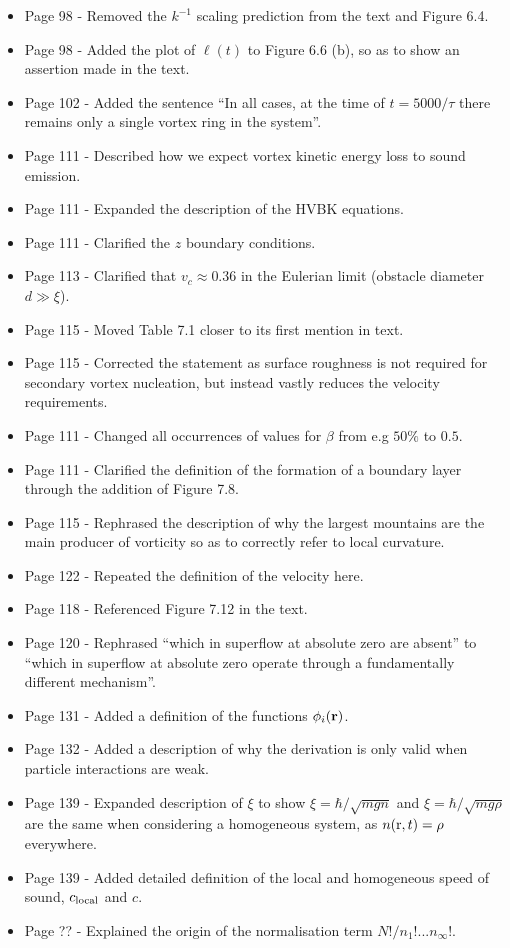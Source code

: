 \documentclass{article}
\begin{document}
\begin{itemize}
\item Page 98 - Removed the $k^{-1}$ scaling prediction from the text and Figure 6.4.
\item Page 98 - Added the plot of $\ell(t)$ to Figure 6.6 (b), so as to show an assertion made in the text.
\item Page 102 - Added the sentence ``In all cases, at the time of $t=5000/\tau$ there remains only a single vortex ring in the system''.
\item Page 111 - Described how we expect vortex kinetic energy loss to sound emission.
\item Page 111 - Expanded the description of the HVBK equations.
\item Page 111 - Clarified the $z$ boundary conditions.
\item Page 113 - Clarified that $v_c \approx 0.36$ in the Eulerian limit (obstacle diameter $d \gg \xi$).
\item Page 115 - Moved Table 7.1 closer to its first mention in text.
\item Page 115 - Corrected the statement as surface roughness is not required for secondary vortex nucleation, but instead vastly reduces the velocity requirements.
\item Page 111 - Changed all occurrences of values for $\beta$ from e.g $50\%$ to $0.5$.
\item Page 111 - Clarified the definition of the formation of a boundary layer through the addition of Figure 7.8.
\item Page 115 - Rephrased the description of why the largest mountains are the main producer of vorticity so as to correctly refer to local curvature.
\item Page 122 - Repeated the definition of the velocity here.
\item Page 118 - Referenced Figure 7.12 in the text.
\item Page 120 - Rephrased ``which in superflow at absolute zero are absent'' to ``which in superflow at absolute zero operate through a fundamentally different mechanism''.
\item Page 131 - Added a definition of the functions $\phi_i({\bf r})$.
\item Page 132 - Added a description of why the derivation is only valid when particle interactions are weak.
\item Page 139 - Expanded description of $\xi$ to show $\xi = \hbar/\sqrt{mgn}$ and $\xi = \hbar/\sqrt{mg\rho}$ are the same when considering a homogeneous system, as $n({\rm r},t) = \rho$ everywhere.
\item Page 139 - Added detailed definition of the local and homogeneous speed of sound, $c_{\rm local}$ and $c$.
\item Page ?? - Explained the origin of the normalisation term $N!/n_1!...n_\infty!$.


\end{itemize}
\end{document}
